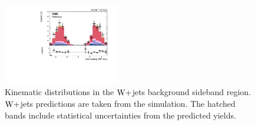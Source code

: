 \begin{figure}[!htbp]
\includegraphics[width=0.45\textwidth]{Plots/plots/DibosonBoostedElMuCuts13TeV_WjetControlRegion_Tighter_CHS_vbf_maxpt_j2_eta.pdf}
\caption{Kinematic distributions in the $\mathrm{W}+$jets background sideband region. $\mathrm{W}+$jets predictions are taken from the simulation. The hatched bands include statistical uncertainties from the predicted yields.}
\label{fig:wjet_control}
\end{figure}
 
